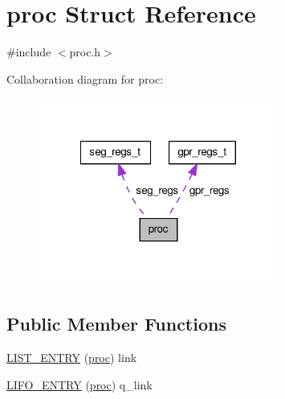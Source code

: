 \hypertarget{structproc}{\section{proc \-Struct \-Reference}
\label{structproc}
}


{\ttfamily \#include $<$proc.\-h$>$}



\-Collaboration diagram for proc\-:\nopagebreak
\begin{figure}[H]
\begin{center}
\leavevmode
\includegraphics[width=224pt]{structproc__coll__graph}
\end{center}
\end{figure}
\subsection*{\-Public \-Member \-Functions}
\begin{DoxyCompactItemize}
\item 
\hyperlink{structproc_afa7308103cd5ed76c5d82dcdf7c44dd1}{\-L\-I\-S\-T\-\_\-\-E\-N\-T\-R\-Y} (\hyperlink{structproc}{proc}) link
\item 
\hyperlink{structproc_a47ec8cdb06b0ea0ae9d50289a37891b2}{\-L\-I\-F\-O\-\_\-\-E\-N\-T\-R\-Y} (\hyperlink{structproc}{proc}) q\-\_\-link
\end{DoxyCompactItemize}
